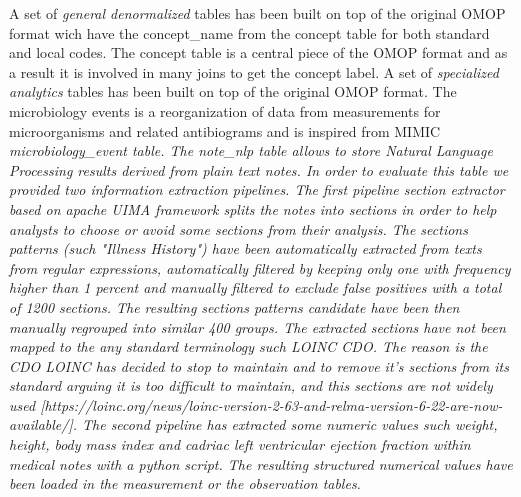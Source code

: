 A set of \emph{general denormalized} tables has been built on top of the
original OMOP format wich have the concept\_name from the concept table for
both standard and local codes. The concept table is a central piece of the OMOP
format and as a result it is involved in many joins to get the concept label. 
A set of \emph{specialized analytics} tables has been built on top of the
original OMOP format. The microbiology events is a reorganization of data from
measurements for microorganisms and related antibiograms and is inspired from
MIMIC \it{microbiology_event} table. 
The \it{note_nlp} table allows to store Natural Language Processing results
derived from plain text notes. In order to evaluate this table we provided
two information extraction pipelines.
The \emph{first} pipeline \emph{section extractor} based on apache UIMA framework
splits the notes into sections in order to help analysts to choose or avoid
some sections from their analysis.  The sections patterns (such "Illness
History") have been automatically extracted from texts from regular
expressions, automatically filtered by keeping only one with frequency higher
than 1 percent and manually filtered to exclude false positives with a total of
1200 sections. The resulting sections patterns candidate have been then
manually regrouped into similar 400 groups.  The extracted sections have not
been mapped to the any standard terminology such LOINC CDO. The reason is the
CDO LOINC has decided to stop to maintain and to remove it's sections from its
standard arguing it is too difficult to maintain, and this sections are not
widely used
[https://loinc.org/news/loinc-version-2-63-and-relma-version-6-22-are-now-available/].
The \emph{second} pipeline has extracted some numeric values such weight,
height, body mass index and cadriac left ventricular ejection fraction within
medical notes with a python script. The resulting structured numerical values
have been loaded in the measurement or the observation tables.
